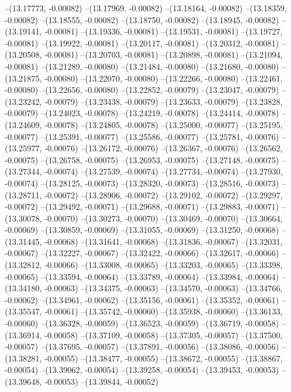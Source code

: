 --(13.17773, -0.00082)
--(13.17969, -0.00082)
--(13.18164, -0.00082)
--(13.18359, -0.00082)
--(13.18555, -0.00082)
--(13.18750, -0.00082)
--(13.18945, -0.00082)
--(13.19141, -0.00081)
--(13.19336, -0.00081)
--(13.19531, -0.00081)
--(13.19727, -0.00081)
--(13.19922, -0.00081)
--(13.20117, -0.00081)
--(13.20312, -0.00081)
--(13.20508, -0.00081)
--(13.20703, -0.00081)
--(13.20898, -0.00081)
--(13.21094, -0.00081)
--(13.21289, -0.00080)
--(13.21484, -0.00080)
--(13.21680, -0.00080)
--(13.21875, -0.00080)
--(13.22070, -0.00080)
--(13.22266, -0.00080)
--(13.22461, -0.00080)
--(13.22656, -0.00080)
--(13.22852, -0.00079)
--(13.23047, -0.00079)
--(13.23242, -0.00079)
--(13.23438, -0.00079)
--(13.23633, -0.00079)
--(13.23828, -0.00079)
--(13.24023, -0.00078)
--(13.24219, -0.00078)
--(13.24414, -0.00078)
--(13.24609, -0.00078)
--(13.24805, -0.00078)
--(13.25000, -0.00077)
--(13.25195, -0.00077)
--(13.25391, -0.00077)
--(13.25586, -0.00077)
--(13.25781, -0.00076)
--(13.25977, -0.00076)
--(13.26172, -0.00076)
--(13.26367, -0.00076)
--(13.26562, -0.00075)
--(13.26758, -0.00075)
--(13.26953, -0.00075)
--(13.27148, -0.00075)
--(13.27344, -0.00074)
--(13.27539, -0.00074)
--(13.27734, -0.00074)
--(13.27930, -0.00074)
--(13.28125, -0.00073)
--(13.28320, -0.00073)
--(13.28516, -0.00073)
--(13.28711, -0.00072)
--(13.28906, -0.00072)
--(13.29102, -0.00072)
--(13.29297, -0.00072)
--(13.29492, -0.00071)
--(13.29688, -0.00071)
--(13.29883, -0.00071)
--(13.30078, -0.00070)
--(13.30273, -0.00070)
--(13.30469, -0.00070)
--(13.30664, -0.00069)
--(13.30859, -0.00069)
--(13.31055, -0.00069)
--(13.31250, -0.00068)
--(13.31445, -0.00068)
--(13.31641, -0.00068)
--(13.31836, -0.00067)
--(13.32031, -0.00067)
--(13.32227, -0.00067)
--(13.32422, -0.00066)
--(13.32617, -0.00066)
--(13.32812, -0.00066)
--(13.33008, -0.00065)
--(13.33203, -0.00065)
--(13.33398, -0.00065)
--(13.33594, -0.00064)
--(13.33789, -0.00064)
--(13.33984, -0.00064)
--(13.34180, -0.00063)
--(13.34375, -0.00063)
--(13.34570, -0.00063)
--(13.34766, -0.00062)
--(13.34961, -0.00062)
--(13.35156, -0.00061)
--(13.35352, -0.00061)
--(13.35547, -0.00061)
--(13.35742, -0.00060)
--(13.35938, -0.00060)
--(13.36133, -0.00060)
--(13.36328, -0.00059)
--(13.36523, -0.00059)
--(13.36719, -0.00058)
--(13.36914, -0.00058)
--(13.37109, -0.00058)
--(13.37305, -0.00057)
--(13.37500, -0.00057)
--(13.37695, -0.00057)
--(13.37891, -0.00056)
--(13.38086, -0.00056)
--(13.38281, -0.00055)
--(13.38477, -0.00055)
--(13.38672, -0.00055)
--(13.38867, -0.00054)
--(13.39062, -0.00054)
--(13.39258, -0.00054)
--(13.39453, -0.00053)
--(13.39648, -0.00053)
--(13.39844, -0.00052)
